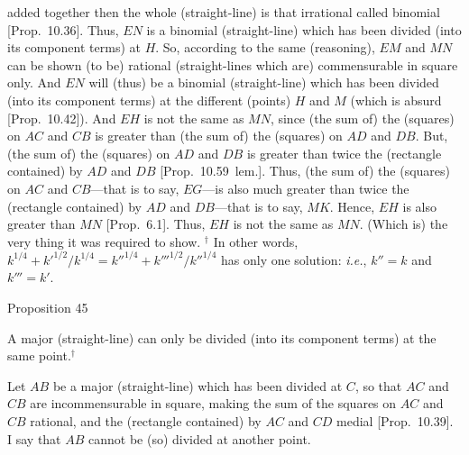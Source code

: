 added together then the whole (straight-line) is that irrational called
binomial [Prop.~10.36]. Thus, $EN$
is a binomial (straight-line) which has been divided (into its component terms) at $H$. So, according to
the same (reasoning), $EM$ and $MN$ can be shown (to be) rational
(straight-lines which are) commensurable in square only. And $EN$
will (thus) be a binomial (straight-line) which has been divided (into its component terms) at the different (points)
$H$ and $M$ (which is absurd [Prop.~10.42]).
And $EH$ is not the same as $MN$, since (the sum of) the
(squares) on $AC$ and $CB$ is greater than (the sum of) the (squares) on
$AD$ and $DB$. But, (the sum of) the (squares) on $AD$ and $DB$
is greater than twice the (rectangle contained) by $AD$ and $DB$ [Prop.~10.59~lem.]. Thus,  (the sum of) the (squares) on $AC$ and $CB$---that is to say, $EG$---is also much greater than twice the (rectangle contained) by 
$AD$ and $DB$---that is to say, $MK$. Hence, $EH$ is also greater
than $MN$ [Prop.~6.1]. Thus, $EH$ is not the same as $MN$. (Which is) the very thing
it was required to show.
{\footnotesize\noindent$^\dag$ In other words, $k^{1/4}+k'^{1/2}/k^{1/4}
= k''^{1/4}+k'''^{1/2}/k''^{1/4}$
has only one solution: {\em i.e.}, $k''=k$ and $k'''=k'$.}


\begin{center}
{\large Proposition 45}
\end{center}

A major (straight-line) can only  be divided (into
its component terms) at the same
point.$^\dag$

\epsfysize=0.3in
\centerline{}

Let $AB$ be a major (straight-line) which has been divided at $C$, so
that $AC$ and $CB$ are incommensurable in square, making the sum
of the squares on $AC$ and $CB$ rational, and the (rectangle contained)
by $AC$ and $CD$ medial [Prop.~10.39].
I say that $AB$ cannot be (so) divided at another point.

